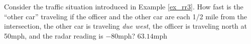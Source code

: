 {Consider the traffic situation introduced in Example \ref{ex_rr3}. How fast is the ``other car'' traveling if the officer and the other car are each 1/2 mile from the intersection, the other car is traveling \textit{due west}, the officer is traveling north at 50mph, and the radar reading is $-80$mph?
}
{$63.14$mph
}

